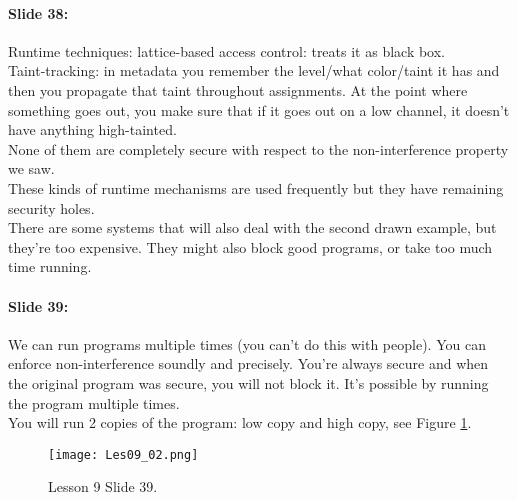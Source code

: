 \documentclass[10pt,a4paper]{report}
\begin{document}
\paragraph{Slide 38:} Runtime techniques: lattice-based access control: treats it as black box.\\
Taint-tracking: in metadata you remember the level/what color/taint it has and then you propagate that taint throughout assignments. At the point where something goes out, you make sure that if it goes out on a low channel, it doesn't have anything high-tainted.\\ 
None of them are completely secure with respect to the non-interference property we saw. \\
These kinds of runtime mechanisms are used frequently but they have remaining security holes. \\
There are some systems that will also deal with the second drawn example, but they're too expensive. They might also block good programs, or take too much time running.

\paragraph{Slide 39:} We can run programs multiple times (you can't do this with people). You can enforce non-interference soundly and precisely. You're always secure and when the original program was secure, you will not block it. It's possible by running the program multiple times.\\
You will run 2 copies of the program: low copy and high copy, see Figure \ref{les09_02}.

\begin{figure}[ht!]
\centering
\texttt{[image: Les09\_02.png]}
\caption{Lesson 9 Slide 39.} 
\label{les09_02}
\end{figure}
\end{document}

